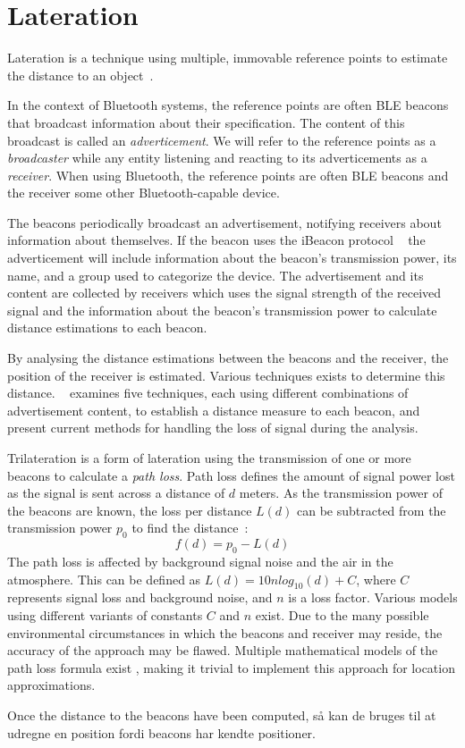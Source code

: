 \section{Lateration}
Lateration is a technique using multiple, immovable reference points to estimate the distance to an object~\cite{presence_ble_review}.



In the context of Bluetooth systems, the reference points are often BLE beacons that broadcast information about their specification. 
The content of this broadcast is called an \textit{adverticement}. 
We will refer to the reference points as a \textit{broadcaster} while any entity listening and reacting to its adverticements as a \textit{receiver}.
When using Bluetooth, the reference points are often BLE beacons and the receiver some other Bluetooth-capable device.~\cite{apple2023ibeacon} 

The beacons periodically broadcast an advertisement, notifying receivers about information about themselves. 
If the beacon uses the iBeacon protocol ~\cite{apple2023ibeacon} the adverticement will include information about the beacon's transmission power, its name, and a group used to categorize the device.
The advertisement and its content are collected by receivers which uses the signal strength of the received signal and the information about the beacon's transmission power to calculate distance estimations to each beacon. 

By analysing the distance estimations between the beacons and the receiver, the position of the receiver is estimated.
Various techniques exists to determine this distance.
\citeauthor{presence_ble_review}~\cite{presence_ble_review} examines five techniques, each using different combinations of advertisement content, to establish a distance measure to each beacon, and present current methods for handling the loss of signal during the analysis.

Trilateration is a form of lateration using the transmission of one or more beacons to calculate a \textit{path loss}.
Path loss defines the amount of signal power lost as the signal is sent across a distance of $d$ meters.
As the transmission power of the beacons are known, the loss per distance $L(d)$ can be subtracted from the transmission power $p_0$ to find the distance~\cite{taking_localization_to_the_wild}:
\begin{equation}\label{distance_equation}
    f(d) = p_0 - L(d)
\end{equation}
The path loss is affected by background signal noise and the air in the atmosphere.
This can be defined as $L(d) = 10n log_{10}(d)+C$, where $C$ represents signal loss and background noise, and $n$ is a loss factor. \cite{taking_localization_to_the_wild}
Various models using different variants of constants $C$ and $n$ exist\cite{path_loss_models}.
Due to the many possible environmental circumstances in which the beacons and receiver may reside, the accuracy of the approach may be flawed\cite{presence_ble_review}. 
Multiple mathematical models of the path loss formula exist \cite{rssi_indoor_pos,positioning_alg_rssi, RSSI_ZigBee_distance}, making it trivial to implement this approach for location approximations.

Once the distance to the beacons have been computed, så kan de bruges til at udregne en position fordi beacons har kendte positioner. 